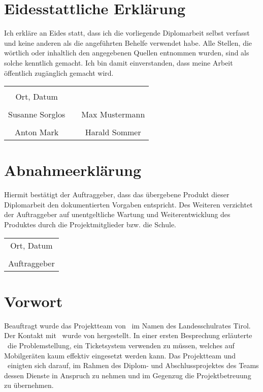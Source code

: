 \chapter*{Eidesstattliche Erklärung}
Ich erkläre an Eides statt, dass ich die vorliegende Diplomarbeit selbst verfasst und keine anderen als die angeführten Behelfe verwendet habe. Alle Stellen, die wörtlich oder inhaltlich den angegebenen Quellen entnommen wurden, sind als solche kenntlich gemacht.
Ich bin damit einverstanden, dass meine Arbeit öffentlich zugänglich gemacht wird.

\vspace{1cm}
\begin{tabular}{c c c}
	& \hspace{4cm} & \\\cline{1-1}
	Ort, Datum & & \\
	\vspace{2cm}
	& & \\\cline{1-1}\cline{3-3}
	Susanne Sorglos & & Max Mustermann \\ 
	\vspace{2cm}
	& & \\\cline{1-1}\cline{3-3}
	Anton Mark & & Harald Sommer \\ 
\end{tabular}

\chapter*{Abnahmeerklärung}
Hiermit bestätigt der Auftraggeber, dass das übergebene Produkt dieser Diplomarbeit den dokumentierten Vorgaben entspricht. Des Weiteren verzichtet der Auftraggeber auf unentgeltliche Wartung und Weiterentwicklung des Produktes durch die Projektmitglieder bzw. die Schule.

\vspace{1cm}
\begin{tabular}{c}
	\\\cline{1-1}
	Ort, Datum\\
	\vspace{2cm}
	\\\cline{1-1}
	Auftraggeber
\end{tabular}	

\chapter*{Vorwort}
Beauftragt wurde das Projektteam von \getHammerl\ im Namen des Landesschulrates Tirol. Der Kontakt mit \getHammerl\ wurde von \getAlex hergestellt. In einer ersten Besprechung erläuterte \getHammerl\ die Problemstellung, ein Ticketsystem verwenden zu müssen, welches auf Mobilgeräten kaum effektiv eingesetzt werden kann. Das Projektteam und \getHammerl\ einigten sich darauf, im Rahmen des Diplom- und Abschlussprojektes des Teams dessen Dienste in Anspruch zu nehmen und im Gegenzug die Projektbetreuung zu übernehmen.



